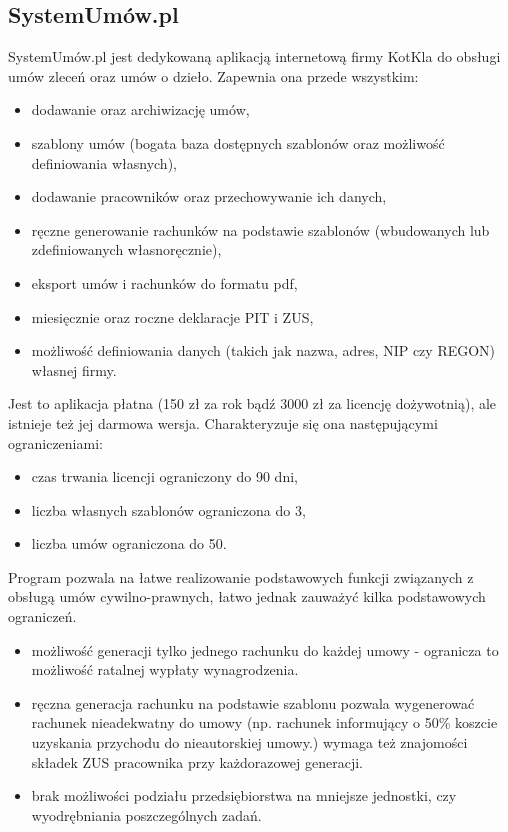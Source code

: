 \subsection[SystemUmów.pl][SystemUmów.pl]{SystemUmów.pl}
SystemUmów.pl jest dedykowaną aplikacją internetową firmy KotKla do obsługi umów zleceń oraz umów o dzieło. Zapewnia ona przede wszystkim:
\begin{itemize}
	\item dodawanie oraz archiwizację umów,
	\item szablony umów (bogata baza dostępnych szablonów oraz możliwość definiowania własnych),
	\item dodawanie pracowników oraz przechowywanie ich danych,
	\item ręczne generowanie rachunków na podstawie szablonów (wbudowanych lub zdefiniowanych własnoręcznie),
	\item eksport umów i rachunków do formatu pdf,
	\item miesięcznie oraz roczne deklaracje PIT i ZUS,
	\item możliwość definiowania danych (takich jak nazwa, adres, NIP czy REGON) własnej firmy.
\end{itemize}

Jest to aplikacja płatna (150 zł za rok bądź 3000 zł za licencję dożywotnią), ale istnieje też jej darmowa wersja. Charakteryzuje się ona następującymi ograniczeniami:
\begin{itemize}
	\item czas trwania licencji ograniczony do 90 dni,
	\item liczba własnych szablonów ograniczona do 3,
	\item liczba umów ograniczona do 50.
\end{itemize}
Program pozwala na łatwe realizowanie podstawowych funkcji związanych z obsługą umów cywilno-prawnych, łatwo jednak zauważyć kilka podstawowych ograniczeń.
\begin{itemize}
	\item możliwość generacji tylko jednego rachunku do każdej umowy - ogranicza to możliwość ratalnej wypłaty wynagrodzenia.
	\item ręczna generacja rachunku na podstawie szablonu pozwala wygenerować rachunek nieadekwatny do umowy (np. rachunek informujący o 50\% koszcie uzyskania przychodu do nieautorskiej umowy.) wymaga też znajomości składek ZUS pracownika przy każdorazowej generacji.
	\item brak możliwości podziału przedsiębiorstwa na mniejsze jednostki, czy wyodrębniania poszczególnych zadań.
\end{itemize}

